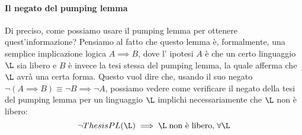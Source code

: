\documentclass[class=book, crop=false, oneside, 12pt]{standalone}
\begin{document}
  \paragraph{Il negato del pumping lemma}
  Di preciso, come possiamo usare il pumping lemma per ottenere quest'informazione? Pensiamo al fatto che questo lemma è, formalmente, una semplice implicazione logica \(A \implies B\), dove l' ipotesi \(A\) è che un certo linguaggio \(\L\) sia libero e \(B\) è invece la tesi stessa del pumping lemma, la quale afferma che \(\L\) avrà una certa forma. Questo vuol dire che, usando il suo negato \(\neg (A \implies B) \equiv \neg B \implies \neg A\), possiamo vedere come verificare il negato della tesi del pumping lemma per un linguaggio \(\L\) implichi necessariamente che \(\L\) non è libero:
  \begin{equation}
    \label{eq:pl-neg-abstract}
    \neg ThesisPL(\L) \implies \L\; \textrm{non è libero,}\; \forall \L
  \end{equation}
\end{document}
